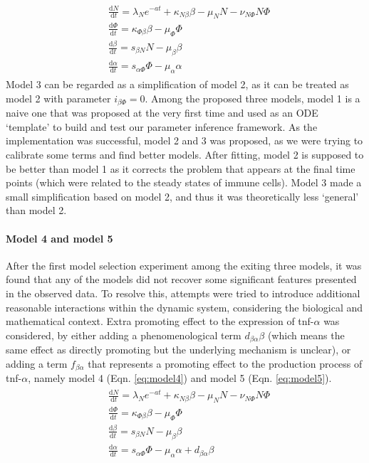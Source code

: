 \begin{align}
    \label{eq:model3}
    \begin{split}
        &\frac{\mathrm{d} N}{\mathrm{d} t}=\lambda_Ne^{-at}+\kappa_{N\beta}\beta-\mu_NN-\nu_{N\Phi}N\Phi\\
        &\frac{\mathrm{d} \Phi}{\mathrm{d} t}=\kappa_{\Phi\beta}\beta-\mu_\Phi\Phi\\
        &\frac{\mathrm{d} \beta}{\mathrm{d} t}=s_{\beta N}N-\mu_\beta\beta\\
        &\frac{\mathrm{d} \alpha}{\mathrm{d} t}=s_{\alpha\Phi}\Phi-\mu_\alpha\alpha
    \end{split}
\end{align}
Model 3 can be regarded as a simplification of model 2, as it can be treated as model 2 with parameter $i_{\beta\Phi}=0$. Among the proposed three models, model 1 is a naive one that was proposed at the very first time and used as an ODE `template' to build and test our parameter inference framework. As the implementation was successful, model 2 and 3 was proposed, as we were trying to calibrate some terms and find better models. After fitting, model 2 is supposed to be better than model 1 as it corrects the problem that appears at the final time points (which were related to the steady states of immune cells). Model 3 made a small simplification based on model 2, and thus it was theoretically less `general' than model 2.

\paragraph{Model 4 and model 5}

After the first model selection experiment among the exiting three models, it was found that any of the models did not recover some significant features presented in the observed data. To resolve this, attempts were tried to introduce additional reasonable interactions within the dynamic system, considering the biological and mathematical context. Extra promoting effect to the expression of tnf-$\alpha$ was considered, by either adding a phenomenological term $d_{\beta\alpha}\beta$ (which means the same effect as directly promoting but the underlying mechanism is unclear), or adding a term $f_{\beta\alpha}$ that represents a promoting effect to the production process of tnf-$\alpha$, namely model 4 (Eqn. \ref{eq:model4}) and model 5 (Eqn. \ref{eq:model5}).
\begin{align}
    \label{eq:model4}
    \begin{split}
        &\frac{\mathrm{d} N}{\mathrm{d} t}=\lambda_Ne^{-at}+\kappa_{N\beta}\beta-\mu_NN-\nu_{N\Phi}N\Phi\\
        &\frac{\mathrm{d} \Phi}{\mathrm{d} t}=\kappa_{\Phi\beta}\beta-\mu_\Phi\Phi\\
        &\frac{\mathrm{d} \beta}{\mathrm{d} t}=s_{\beta N}N-\mu_\beta\beta\\
        &\frac{\mathrm{d} \alpha}{\mathrm{d} t}=s_{\alpha\Phi}\Phi-\mu_\alpha\alpha+d_{\beta\alpha}\beta
    \end{split}
\end{align}

